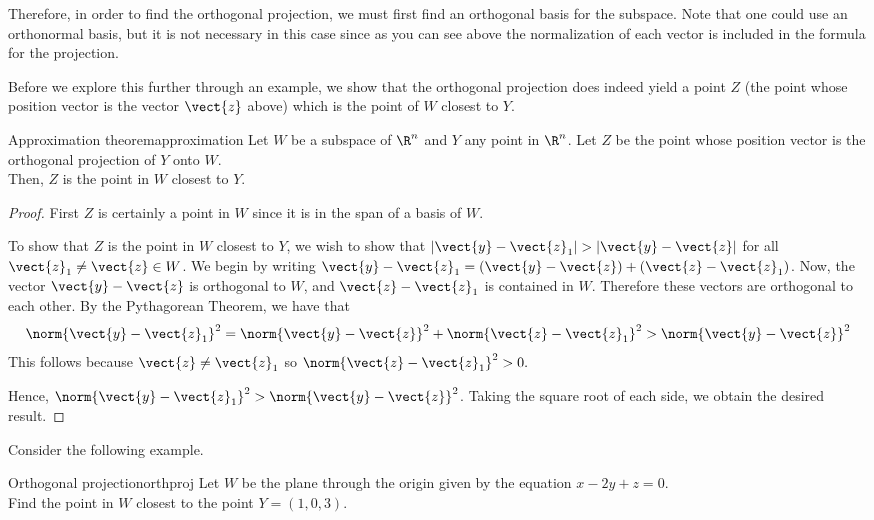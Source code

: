 Therefore, in order to find the orthogonal projection, we must first
find an orthogonal basis for the subspace. Note that one could use an
orthonormal basis, but it is not necessary in this case since as you
can see above the normalization of each vector is included in the
formula for the projection.

Before we explore this further through an example, we show that the
orthogonal projection does indeed yield a point $Z$ (the point whose position
vector is the vector $\vect{z}$ above) which is the point of $W$
closest to $Y$.

\begin{theorem}{Approximation theorem}{approximation}
Let $W$ be a subspace of $\R^n$ and $Y$ any point in
$\R^n$. Let $Z$ be the point whose position vector is the
orthogonal projection of $Y$ onto $W$. \\
Then, $Z$ is the point in $W$ closest to $Y$.
\end{theorem}

\begin{proof}
First $Z$ is certainly a point in $W$  since it is in the span of a basis of $W$. 

To show that $Z$ is the point in $W$ closest to $Y$, we wish to show
that $|\vect{y}-\vect{z}_1| > |\vect{y}-\vect{z}|$ for all $\vect{z}_1
\neq \vect{z} \in W$.  We begin by writing $\vect{y}-\vect{z}_1 =
(\vect{y} - \vect{z}) + (\vect{z} -
\vect{z}_1)$.  Now, the vector $\vect{y} - \vect{z}$ is orthogonal to
$W$, and $\vect{z} - \vect{z}_1$ is contained in $W$. Therefore these
vectors are orthogonal to each other. By the Pythagorean Theorem, we
have that
\[
\norm{\vect{y} - \vect{z}_1}^2 = \norm{\vect{y} - \vect{z}} ^2 + \norm{\vect{z} -\vect{z}_1} ^2 > \norm{\vect{y} - \vect{z}}^2
\]
This follows because $\vect{z} \neq \vect{z}_1$ so
$\norm{\vect{z} -\vect{z}_1}^2 > 0.$

Hence, $\norm{\vect{y} - \vect{z}_1}^2 > \norm{
\vect{y} - \vect{z}}^2$. Taking the square root of each
side, we obtain the desired result.
\end{proof}

Consider the following example.

\begin{example}{Orthogonal projection}{orthproj}
Let $W$ be the plane through the origin given by the equation $x - 2y
+ z = 0$. \\
Find the point in $W$ closest to the point $Y = (1,0,3)$.
\end{example}

